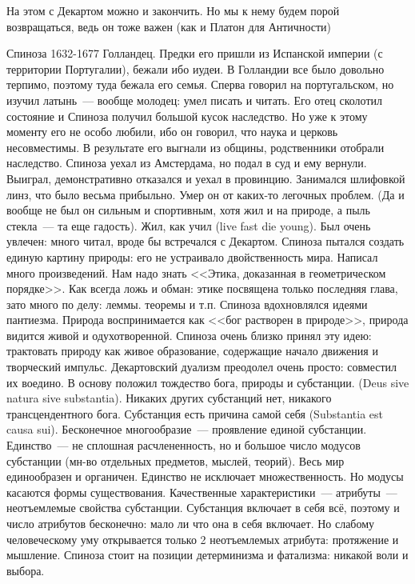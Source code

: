На этом с Декартом можно и закончить. Но мы к нему будем порой возвращаться, ведь он тоже важен (как и Платон для Античности)

Спиноза 1632-1677 Голландец.
Предки его пришли из Испанской империи (с территории Португалии), бежали ибо иудеи. В Голландии все было довольно терпимо, поэтому туда бежала его семья. Сперва говорил на португальском, но изучил латынь~--- вообще молодец: умел писать и читать. Его отец сколотил состояние и Спиноза получил большой кусок наследство. Но уже к этому моменту его не особо любили, ибо он говорил, что наука и церковь несовместимы. В результате его выгнали из общины, родственники отобрали наследство. Спиноза уехал из Амстердама, но подал в суд и ему вернули. Выиграл, демонстративно отказался и уехал в провинцию. Занимался шлифовкой линз, что было весьма прибыльно. Умер он от каких-то легочных проблем. (Да и вообще не был он сильным и спортивным, хотя жил и на природе, а пыль стекла~--- та еще гадость). Жил, как учил (live fast die young).  Был очень увлечен: много читал, вроде бы встречался с Декартом. Спиноза пытался создать единую картину природы: его не устраивало двойственность мира. Написал много произведений. Нам надо знать <<Этика, доказанная в геометрическом порядке>>. Как всегда ложь и обман: этике посвящена только последняя глава, зато много по делу: леммы. теоремы и т.п. Спиноза вдохновлялся идеями пантиезма. Природа воспринимается как <<бог растворен в природе>>, природа видится живой и одухотворенной. Спиноза очень близко принял эту идею: трактовать природу как живое образование, содержащие начало движения и творческий импульс. Декартовский дуализм преодолел очень просто: совместил их воедино. В основу положил тождество бога, природы и субстанции. (Deus sive natura sive substantia). Никаких других субстанций нет, никакого трансцендентного бога. Субстанция есть причина самой себя (Substantia est causa sui). Бесконечное многообразие~--- проявление единой субстанции. Единство~--- не сплошная расчлененность, но и большое число модусов субстанции (мн-во отдельных предметов, мыслей, теорий). Весь мир единообразен и органичен. Единство не исключает множественность. Но модусы касаются формы существования.
Качественные характеристики~--- атрибуты~--- неотъемлемые свойства субстанции. Субстанция включает в себя всё, поэтому и число атрибутов бесконечно: мало ли что она в себя включает. Но слабому человеческому уму открывается только 2 неотъемлемых атрибута: протяжение и мышление.
Спиноза стоит на позиции детерминизма и фатализма: никакой воли и выбора.

